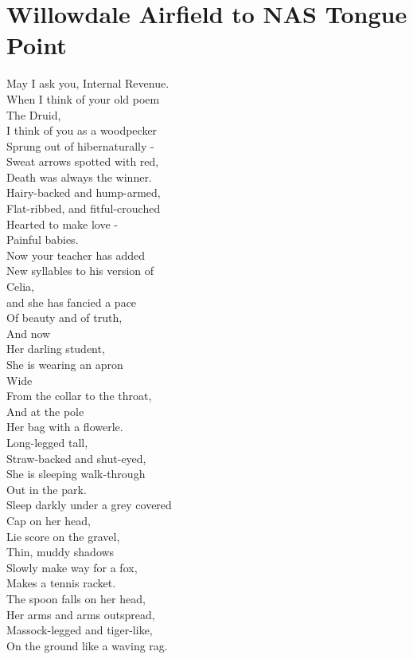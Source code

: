 \documentclass[smalldemyvopaper,11pt,twoside,onecolumn,openright,extrafontsizes]{memoir}
\begin{document}
\chapter{Willowdale Airfield to NAS Tongue Point}
May I ask you, Internal Revenue.
\\When I think of your old poem
\\The Druid,
\\I think of you as a woodpecker
\\Sprung out of hibernaturally -
\\Sweat arrows spotted with red,
\\Death was always the winner.
\\Hairy-backed and hump-armed,
\\Flat-ribbed, and fitful-crouched
\\Hearted to make love -
\\Painful babies.
\\Now your teacher has added
\\New syllables to his version of
\\Celia,
\\and she has fancied a pace
\\Of beauty and of truth,
\\And now
\\Her darling student,
\\She is wearing an apron
\\Wide
\\From the collar to the throat,
\\And at the pole
\\Her bag with a flowerle.
\\Long-legged tall,
\\Straw-backed and shut-eyed,
\\She is sleeping walk-through
\\Out in the park.
\\Sleep darkly under a grey covered
\\Cap on her head,
\\Lie score on the gravel,
\\Thin, muddy shadows
\\Slowly make way for a fox,
\\Makes a tennis racket.
\\The spoon falls on her head,
\\Her arms and arms outspread,
\\Massock-legged and tiger-like,
\\On the ground like a waving rag.
\end{document}
